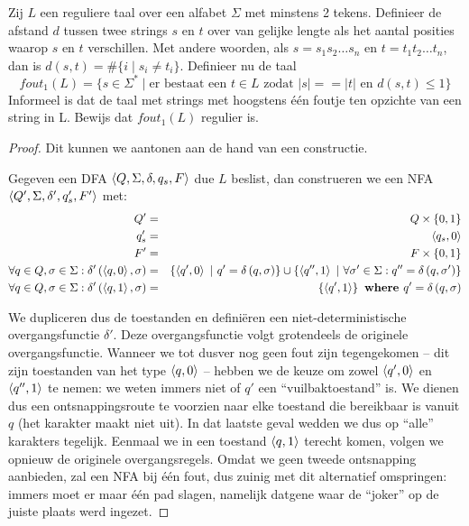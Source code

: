 \documentclass[a4paper]{article}
\begin{document}
\begin{question}
Zij $L$ een reguliere taal over een alfabet $\Sigma$ met minstens 2 tekens. Definieer de afstand $d$ tussen twee strings $s$ en $t$ over van gelijke lengte als het aantal posities waarop $s$ en $t$ verschillen. Met andere woorden, als $s = s_1s_2\ldots s_n$ en $t = t_1t_2\ldots t_n$, dan is $d(s,t) = \#\{ i \mid s_i \neq t_i \}$. Definieer nu de taal
\[ fout_1(L) = \{s \in \Sigma^* \mid \text{er bestaat een $t \in L$ zodat $|s| == |t|$ en $d(s,t) \leq 1$} \}\]
Informeel is dat de taal met strings met hoogstens \'e\'en foutje ten opzichte van een string in L. Bewijs dat $fout_1(L)$ regulier is.
\begin{answer}
\begin{proof}
Dit kunnen we aantonen aan de hand van een constructie.
\begin{construction}
Gegeven een DFA $\left\langle Q,\Sigma,\delta,q_s,F \right\rangle$ due $L$ beslist, dan construeren we een NFA $\left\langle Q',\Sigma,\delta',q_s',F' \right\rangle$ met:
\begin{eqnarray}
Q'&=&Q\times\left\{ 0,1 \right\}\\
q_s'&=&\left\langle q_s,0 \right\rangle\\
F'&=&F\times\left\{ 0,1 \right\}\\
\forall q\in Q,\sigma\in\Sigma:\delta'\left( \left\langle q,0 \right\rangle,\sigma \right)&=&\left\{ \left\langle q',0 \right\rangle\ |\ q'=\delta\left( q,\sigma \right) \right\}\cup\left\{ \left\langle q'',1 \right\rangle\ |\ \forall \sigma'\in\Sigma:q''=\delta\left( q,\sigma' \right) \right\}\\
\forall q\in Q,\sigma\in\Sigma:\delta'\left( \left\langle q,1 \right\rangle,\sigma \right)&=&\left\{ \left\langle q',1 \right\rangle \right\}\mbox{\bf{ where }} q'=\delta\left( q,\sigma \right)
\end{eqnarray}
\end{construction}
We dupliceren dus de toestanden en defini\"eren een niet-deterministische overgangsfunctie $\delta'$. Deze overgangsfunctie volgt grotendeels de originele overgangsfunctie. Wanneer we tot dusver nog geen fout zijn tegengekomen -- dit zijn toestanden van het type $\left\langle q,0 \right\rangle$ -- hebben we de keuze om zowel $\left\langle q',0 \right\rangle$ en $\left\langle q'',1 \right\rangle$ te nemen: we weten immers niet of $q'$ een ``vuilbaktoestand'' is. We dienen dus een ontsnappingsroute te voorzien naar elke toestand die bereikbaar is vanuit $q$ (het karakter maakt niet uit). In dat laatste geval wedden we dus op ``alle'' karakters tegelijk. Eenmaal we in een toestand $\left\langle q,1 \right\rangle$ terecht komen, volgen we opnieuw de originele overgangsregels. Omdat we geen tweede ontsnapping aanbieden, zal een NFA bij \'e\'en fout, dus zuinig met dit alternatief omspringen: immers moet er maar \'e\'en pad slagen, namelijk datgene waar de ``joker'' op de juiste plaats werd ingezet.
\end{proof}
\end{answer}
\end{question}
\end{document}
